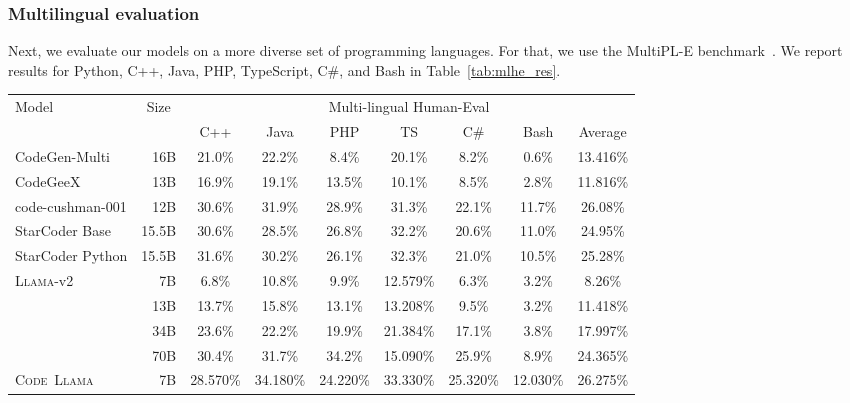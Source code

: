 \documentclass[10pt]{article}
\newcommand{\model}{\textsc{Code~Llama}\xspace}
\newcommand{\llama}{\textsc{Llama}\xspace}
\newcommand*{\acc}[1]{\num[round-mode=places,round-precision=1]{#1}\%}
\begin{document}
\subsubsection{Multilingual evaluation}
\label{sec:multilingual_evals}
Next, we evaluate our models on a more diverse set of programming languages. For that, we use the MultiPL-E benchmark~\citep{cassano2022multiple}. We report results for Python, C++, Java, PHP, TypeScript, C\#, and Bash in Table~\ref{tab:mlhe_res}.

\begin{table}[t!]
  \center
  \setlength{\tabcolsep}{3pt}
  \begin{tabular}{lrcccccc|c} \toprule
  Model & \multicolumn{1}{c}{Size} &\multicolumn{7}{c}{Multi-lingual Human-Eval} \\  &                          & C++ & Java & PHP & TS & C\# & Bash & Average \\
  \midrule
  CodeGen-Multi &16B               & \acc{21.0} & \acc{22.2} & \acc{8.4} & \acc{ 20.1} & \acc{8.2} & \acc{0.6} & \acc{13.416}\\
  CodeGeeX & 13B                   & \acc{16.9} & \acc{19.1} & \acc{13.5} & \acc{10.1} & \acc{8.5} & \acc{2.8} & \acc{11.816} \\
  code-cushman-001 & 12B     & \acc{30.6} & \acc{31.9} & \acc{28.9} & \acc{31.3} & \acc{22.1} & \acc{11.7} & \acc{26.08} \\
  StarCoder Base & 15.5B           & \acc{30.6} & \acc{28.5} & \acc{26.8} & \acc{32.2} & \acc{20.6} & \acc{11.0} & \acc{24.95} \\
  StarCoder Python & 15.5B         & \acc{31.6} & \acc{30.2} & \acc{26.1} & \acc{32.3} & \acc{21.0} & \acc{10.5} & \acc{25.28} \\
  \midrule
  \multirow{ 4}{*}{\llama-v2}&7B   & \acc{6.8}  & \acc{10.8} & \acc{9.9}  & \acc{12.579} & \acc{6.3}  & \acc{3.2} & \acc{8.26} \\ 
  &13B                             & \acc{13.7} & \acc{15.8} & \acc{13.1} & \acc{13.208} & \acc{9.5}  & \acc{3.2} & \acc{11.418} \\ 
  &34B                             & \acc{23.6} & \acc{22.2} & \acc{19.9} & \acc{21.384} & \acc{17.1} & \acc{3.8} & \acc{17.997} \\ 
  &70B                             & \acc{30.4} & \acc{31.7} & \acc{34.2} & \acc{15.090} & \acc{25.9} & \acc{8.9} & \acc{24.365}  \\
  \midrule    
  \multirow{ 3}{*}{\model}  &7B    & \acc{28.570} & \acc{34.180} & \acc{24.220} & \acc{33.330} & \acc{25.320} & \acc{12.030}  & \acc{26.275} \\ 

\end{tabular}
\end{table}
\end{document}
